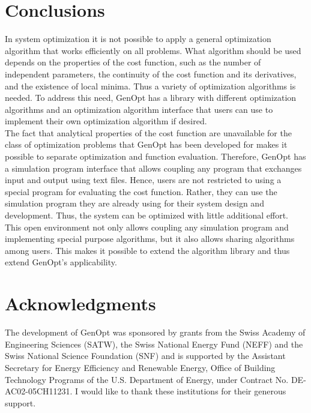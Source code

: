 \chapter{Conclusions}
In system optimization 
it is not possible to apply a general optimization algorithm that works efficiently 
on all problems.
What algorithm should be used depends on the properties of the cost function,
such as the number of independent parameters,
the continuity of the cost function and its derivatives,
and the existence of local minima.
Thus a variety of optimization algorithms is needed.
To address this need, GenOpt has a library with different optimization algorithms
and an optimization algorithm interface that users can use to implement 
their own optimization algorithm if desired.\\

The fact that analytical properties of the cost function are unavailable 
for the class of optimization problems that GenOpt has been developed for
makes it possible to separate optimization and function evaluation.
Therefore, 
GenOpt has a simulation program interface that allows coupling any 
program that exchanges input and output using text files.
Hence,
users are not restricted to using a special program for evaluating the cost function. 
Rather, they can use the simulation program they are already using for their 
system design and development. 
Thus, the system can be optimized with little additional effort.\\

This open environment not only allows coupling any simulation program and 
implementing special purpose algorithms, 
but it also allows sharing algorithms among users.
This makes it possible to extend the algorithm library 
and thus extend GenOpt's applicability.\\

\chapter{Acknowledgments}
The development of GenOpt was sponsored by grants from 
the Swiss Academy of Engineering Sciences (SATW), 
the Swiss National Energy Fund (NEFF) and 
the Swiss National Science Foundation (SNF) 
and is supported by the 
Assistant Secretary for Energy Efficiency
and Renewable Energy, 
Office of Building Technology Programs of the
U.S. Department of Energy, under Contract No.
DE-AC02-05CH11231.
I would like to thank these institutions for their generous support.

